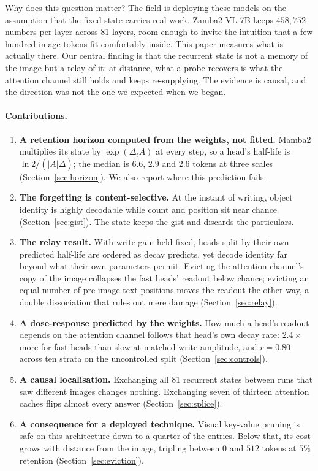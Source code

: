 Why does this question matter? The field is deploying these models on the
assumption that the fixed state carries real work. Zamba2-VL-7B keeps
$458{,}752$ numbers per layer across 81 layers, room enough to invite the
intuition that a few hundred image tokens fit comfortably inside. This paper
measures what is actually there. Our central finding is that the recurrent
state is not a memory of the image but a relay of it: at distance, what a
probe recovers is what the attention channel still holds and keeps
re-supplying. The evidence is causal, and the direction was not the one we
expected when we began.

\paragraph{Contributions.}
\begin{enumerate}\setlength{\itemsep}{1pt}\setlength{\parskip}{0pt}
\item \textbf{A retention horizon computed from the weights, not fitted.}
Mamba2 multiplies its state by $\exp(\Delta_t A)$ at every step, so a head's
half-life is $\ln 2/(|A|\bar{\Delta})$; the median is $6.6$, $2.9$ and $2.6$
tokens at three scales (Section~\ref{sec:horizon}). We also report where this
prediction fails.
\item \textbf{The forgetting is content-selective.} At the instant of writing,
object identity is highly decodable while count and position sit near chance
(Section~\ref{sec:gist}). The state keeps the gist and discards the
particulars.
\item \textbf{The relay result.} With write gain held fixed, heads split by
their own predicted half-life are ordered as decay predicts, yet decode
identity far beyond what their own parameters permit. Evicting the attention
channel's copy of the image collapses the fast heads' readout below chance;
evicting an equal number of pre-image text positions moves the readout the
other way, a double dissociation that rules out mere damage
(Section~\ref{sec:relay}).
\item \textbf{A dose-response predicted by the weights.} How much a head's
readout depends on the attention channel follows that head's own decay rate:
$2.4\times$ more for fast heads than slow at matched write amplitude, and
$r = 0.80$ across ten strata on the uncontrolled split
(Section~\ref{sec:controls}).
\item \textbf{A causal localisation.} Exchanging all 81 recurrent states
between runs that saw different images changes nothing. Exchanging seven of
thirteen attention caches flips almost every answer
(Section~\ref{sec:splice}).
\item \textbf{A consequence for a deployed technique.} Visual key-value
pruning is safe on this architecture down to a quarter of the entries. Below
that, its cost grows with distance from the image, tripling between $0$ and
$512$ tokens at $5\%$ retention (Section~\ref{sec:eviction}).
\end{enumerate}

